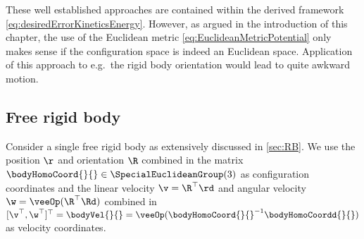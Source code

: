 These well established approaches are contained within the derived framework \eqref{eq:desiredErrorKineticsEnergy}.
However, as argued in the introduction of this chapter, the use of the Euclidean metric \eqref{eq:EuclideanMetricPotential} only makes sense if the configuration space is indeed an Euclidean space.
Application of this approach to e.g.\ the rigid body orientation would lead to quite awkward motion.


\subsection{Free rigid body}\label{sec:CtrlApproachEnergySingleBody}
Consider a single free rigid body as extensively discussed in \autoref{sec:RB}.
We use the position $\r$ and orientation $\R$ combined in the matrix $\bodyHomoCoord{}{} \in \SpecialEuclideanGroup(3)$ as configuration coordinates and the linear velocity $\v = \R^\top \rd$ and angular velocity $\w = \veeOp(\R^\top \Rd)$ combined in $[\v^\top, \w^\top]^\top = \bodyVel{}{} = \veeOp(\bodyHomoCoord{}{}^{-1} \bodyHomoCoordd{}{})$ as velocity coordinates.

